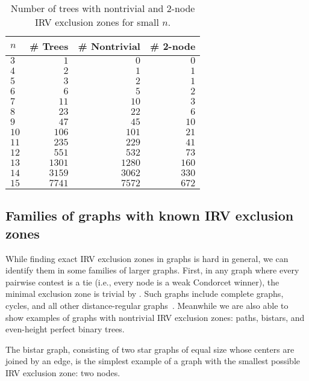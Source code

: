 \documentclass{article}
\theoremstyle{theorem}
\theoremstyle{definition}
\begin{document}
\begin{table}
\centering
  \caption{Number of trees with nontrivial and 2-node IRV exclusion zones for small $n$.}\label{tab:trees}
  \vspace{0.5em}
  \begin{tabular}{lrrr}
  \toprule
    $n$ & \# Trees & \# Nontrivial & \# 2-node\\
    \midrule
$3$ & $1$ & $0$ & $0$\\
$4$ & $2$ & $1$ & $1$\\
$5$ & $3$ & $2$ & $1$\\
$6$ & $6$ & $5$ & $2$\\
$7$ & $11$ & $10$ & $3$\\
$8$ & $23$ & $22$ & $6$\\
$9$ & $47$ & $45$ & $10$\\
$10$ & $106$ & $101$ & $21$\\
$11$ & $235$ & $229$ & $41$\\
$12$ & $551$ & $532$ & $73$\\
$13$ & $1301$ & $1280$ & $160$\\
$14$ & $3159$ & $3062$ & $330$\\
$15$ & $7741$ & $7572$ & $672$\\
\bottomrule
  \end{tabular}
\end{table}

  
\subsection{Families of graphs with known IRV exclusion zones}




While finding exact IRV exclusion zones in graphs is hard in general, we can identify them in some families of larger graphs.  First, in any graph where every pairwise contest is a tie (i.e., every node is a weak Condorcet winner), the minimal exclusion zone is trivial by . Such graphs include complete graphs, cycles, and all other distance-regular graphs~\cite{van2016distance}. Meanwhile we are also able to show examples of graphs with nontrivial IRV exclusion zones: paths, bistars, and even-height perfect binary trees. 

The bistar graph, consisting of two star graphs of equal size whose centers are joined by an edge, is the simplest example of a graph with the smallest possible IRV exclusion zone: two nodes. 
\end{document}
